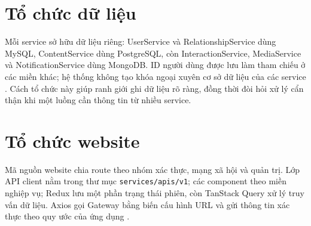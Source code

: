 \section{Tổ chức dữ liệu}
Mỗi service sở hữu dữ liệu riêng: UserService và RelationshipService dùng MySQL, ContentService dùng PostgreSQL, còn InteractionService, MediaService và NotificationService dùng MongoDB. ID người dùng được lưu làm tham chiếu ở các miền khác; hệ thống không tạo khóa ngoại xuyên cơ sở dữ liệu của các service \cite{architecture}. Cách tổ chức này giúp ranh giới ghi dữ liệu rõ ràng, đồng thời đòi hỏi xử lý cẩn thận khi một luồng cần thông tin từ nhiều service.

\section{Tổ chức website}
Mã nguồn website chia route theo nhóm xác thực, mạng xã hội và quản trị. Lớp API client nằm trong thư mục \texttt{services/apis/v1}; các component theo miền nghiệp vụ; Redux lưu một phần trạng thái phiên, còn TanStack Query xử lý truy vấn dữ liệu. Axios gọi Gateway bằng biến cấu hình URL và gửi thông tin xác thực theo quy ước của ứng dụng \cite{architecture}.
